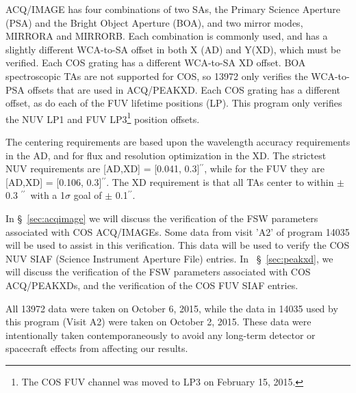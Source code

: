 \documentclass[12pt]{reportj}
\def\arcsec{\hbox{$^{\prime\prime}$}}
\begin{document}
ACQ/IMAGE has four combinations of two SAs, the Primary Science Aperture (PSA) and the Bright
Object Aperture (BOA), and two mirror modes, MIRRORA and MIRRORB. Each combination is commonly used, and has a slightly different
WCA-to-SA offset in both X (AD) and Y(XD), which must be verified. Each COS grating has a different WCA-to-SA XD offset.
BOA spectroscopic TAs are not supported for COS, so 13972 only verifies the WCA-to-PSA offsets that are used in ACQ/PEAKXD.
Each COS grating has a different offset, as do each of the FUV lifetime positions (LP). This program only verifies the NUV LP1
and FUV LP3\footnote{The COS FUV channel was moved to LP3 on February 15, 2015.} position offsets.

The centering requirements are based upon the wavelength accuracy requirements in the AD, and for flux and resolution optimization
in the XD. The strictest NUV requirements are [AD,XD] = [0.041, 0.3]\arcsec, while for the FUV they are [AD,XD] = [0.106, 0.3]\arcsec. The XD
requirement is that all TAs center to within $\pm$ 0.3 \arcsec\ with a 1$\sigma$ goal of $\pm$ 0.1\arcsec.

In \S~\ref{sec:acqimage} we will discuss the verification of the FSW parameters associated with COS ACQ/IMAGEs.
Some data from visit 'A2' of program 14035 will be used to assist in this verification. This data will be used to verify
the COS NUV SIAF (Science Instrument Aperture File) entries. In ~\S~\ref{sec:peakxd},
we will discuss the verification of the FSW parameters associated with COS ACQ/PEAKXDs, and the verification of the
COS FUV SIAF entries.

All 13972 data were taken on October 6, 2015, while the data in 14035 used by this program (Visit A2) were taken on October 2, 2015.
These data were intentionally taken contemporaneously to avoid any long-term detector or spacecraft effects from affecting our results.\\

\newpage
\end{document}
